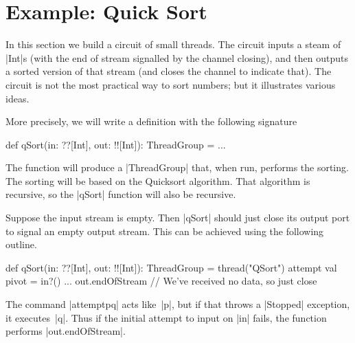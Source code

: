 \def\comp#1#2#3{%
  \draw (#1)+(#3,0) node {$\bullet$};
  \draw (#2)+(#3,0) node (n2) {$\bullet$};
  \draw[thick] (#1)+(#3,0) -- (n2.center);
}


\section{Example: Quick Sort}

In this section we build a circuit of small threads.  The circuit inputs a
steam of |Int|s (with the end of stream signalled by the channel closing), and
then outputs a sorted version of that stream (and closes the channel to
indicate that).  The circuit is not the most practical way to sort numbers;
but it illustrates various ideas.

More precisely, we will write a  definition with the following signature
%
\begin{scala}
  def qSort(in: ??[Int], out: !![Int]): ThreadGroup = ...
\end{scala}
%
The function will produce a |ThreadGroup| that, when run, performs the
sorting.  The sorting will be based on the Quicksort algorithm.  That
algorithm is recursive, so the |qSort| function will also be recursive.



Suppose the input stream is empty.  Then |qSort| should just close its output
port to signal an empty output stream.  This can be achieved using the
following outline.
%
\begin{scala}
  def qSort(in: ??[Int], out: !![Int]): ThreadGroup = thread("QSort"){
    attempt{
      val pivot = in?()
      ...
    }{
      out.endOfStream // We've received no data, so just close
    }
  }
\end{scala}
%
The command |attempt{p}{q}| acts like~|p|, but if that throws a |Stopped|
exception, it executes~|q|.  Thus if the initial attempt to input on |in|
fails, the function performs |out.endOfStream|.

